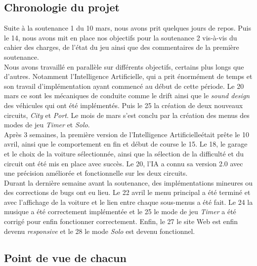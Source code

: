 \documentclass[12pt,a4paper]{article}
\newcommand{\AI}{Intelligence Artificielle}
\begin{document}
        \subsection{Chronologie du projet}
            Suite à la soutenance 1 du 10 mars, nous avons prit quelques jours de repos. Puis le 14, nous
            avons mit en place nos objectifs pour la soutenance 2 vis-à-vis du cahier des charges, de
            l'état du jeu ainsi que des commentaires de la première soutenance.\\
            Nous avons travaillé en parallèle sur différents objectifs, certains plus longs que d'autres.
            Notamment l'\AI, qui a prit énormément de temps et son travail d'implémentation ayant
            commencé au début de cette période. Le 20 mars ce sont les mécaniques de conduite comme le
            drift ainsi que le \textit{sound design} des véhicules qui ont été implémentés. Puis le 25 la
            création de deux nouveaux circuits, \textsl{City} et \textsl{Port}. Le mois de mars s'est
            conclu par la création des menus des modes de jeu \textsl{Timer} et \textsl{Solo}.\\
            Après 3 semaines, la première version de l'\AI était prête le 10 avril, ainsi que le
            comportement en fin et début de course le 15. Le 18, le garage et le choix de la voiture 
            sélectionnée, ainsi que la sélection de la difficulté et du circuit ont été mis en place avec
            succès. Le 20, l'IA a connu sa version 2.0 avec une précision améliorée et fonctionnelle sur
            les deux circuits.\\
            Durant la dernière semaine avant la soutenance, des implémentations mineures ou des
            corrections de bugs ont eu lieu. Le 22 avril le menu principal a été terminé et avec
            l'affichage de la voiture et le lien entre chaque sous-menus a été fait. Le 24 la musique a
            été correctement implémentée et le 25 le mode de jeu \textsl{Timer} a été corrigé pour enfin
            fonctionner correctement. Enfin, le 27 le site Web est enfin devenu \textit{responsive} et le
            28 le mode \textsl{Solo} est devenu fonctionnel.

        \subsection{Point de vue de chacun}
\end{document}
